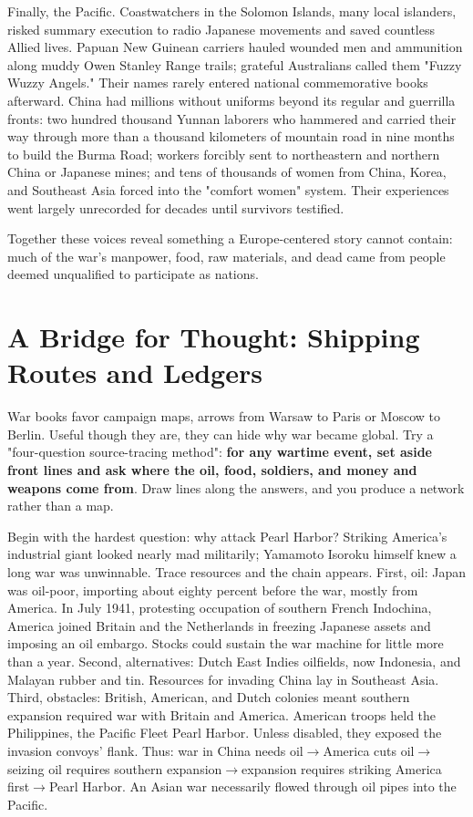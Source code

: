 Finally, the Pacific. Coastwatchers in the Solomon Islands, many local islanders, risked summary execution to radio Japanese movements and saved countless Allied lives. Papuan New Guinean carriers hauled wounded men and ammunition along muddy Owen Stanley Range trails; grateful Australians called them "Fuzzy Wuzzy Angels." Their names rarely entered national commemorative books afterward. China had millions without uniforms beyond its regular and guerrilla fronts: two hundred thousand Yunnan laborers who hammered and carried their way through more than a thousand kilometers of mountain road in nine months to build the Burma Road; workers forcibly sent to northeastern and northern China or Japanese mines; and tens of thousands of women from China, Korea, and Southeast Asia forced into the "comfort women" system. Their experiences went largely unrecorded for decades until survivors testified.

Together these voices reveal something a Europe-centered story cannot contain: much of the war's manpower, food, raw materials, and dead came from people deemed unqualified to participate as nations.

\section[Shipping Routes and Ledgers]{A Bridge for Thought: Shipping Routes and Ledgers}
War books favor campaign maps, arrows from Warsaw to Paris or Moscow to Berlin. Useful though they are, they can hide why war became global. Try a "four-question source-tracing method": \textbf{for any wartime event, set aside front lines and ask where the oil, food, soldiers, and money and weapons come from}. Draw lines along the answers, and you produce a network rather than a map.

Begin with the hardest question: why attack Pearl Harbor? Striking America's industrial giant looked nearly mad militarily; Yamamoto Isoroku himself knew a long war was unwinnable. Trace resources and the chain appears. First, oil: Japan was oil-poor, importing about eighty percent before the war, mostly from America. In July 1941, protesting occupation of southern French Indochina, America joined Britain and the Netherlands in freezing Japanese assets and imposing an oil embargo. Stocks could sustain the war machine for little more than a year. Second, alternatives: Dutch East Indies oilfields, now Indonesia, and Malayan rubber and tin. Resources for invading China lay in Southeast Asia. Third, obstacles: British, American, and Dutch colonies meant southern expansion required war with Britain and America. American troops held the Philippines, the Pacific Fleet Pearl Harbor. Unless disabled, they exposed the invasion convoys' flank. Thus: war in China needs oil$\rightarrow$America cuts oil$\rightarrow$seizing oil requires southern expansion$\rightarrow$expansion requires striking America first$\rightarrow$Pearl Harbor. An Asian war necessarily flowed through oil pipes into the Pacific.

